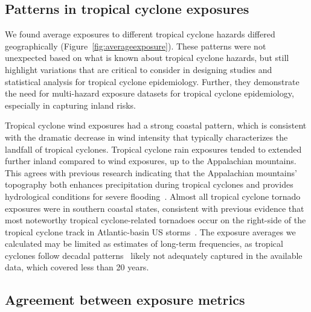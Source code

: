 \subsection*{Patterns in tropical cyclone exposures}

We found average exposures to different tropical cyclone hazards differed
geographically (Figure~\ref{fig:averageexposure}). These patterns were not
unexpected based on what is known about tropical cyclone hazards, but still
highlight variations that are critical to consider in designing studies and
statistical analysis for tropical cyclone epidemiology. Further, they
demonstrate the need for multi-hazard exposure datasets for tropical cyclone
epidemiology, especially in capturing inland risks. 

Tropical cyclone wind exposures had a strong coastal pattern, which is
consistent with the dramatic decrease in wind intensity that typically
characterizes the landfall of tropical cyclones.  Tropical cyclone rain
exposures tended to extended further inland compared to wind exposures, up to
the Appalachian mountains. This agrees with previous research indicating that
the Appalachian mountains' topography both enhances precipitation during
tropical cyclones and provides hydrological conditions for severe
flooding~\parencite{rees2001}.  Almost all tropical cyclone tornado exposures
were in southern coastal states, consistent with previous evidence that most
noteworthy tropical cyclone-related tornadoes occur on the right-side of the
tropical cyclone track in Atlantic-basin \ac{US} storms~\parencite{moore2012}.
The exposure averages we calculated may be limited as estimates of
long-term frequencies, as tropical cyclones follow decadal
patterns~\parencite{kossin2007more} likely not adequately captured in the
available data, which covered less than 20 years. 

\subsection*{Agreement between exposure metrics}

